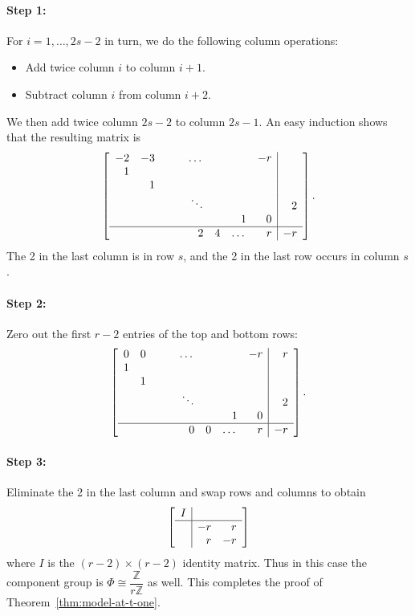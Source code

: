 \documentclass[reqno]{amsart}
\theoremstyle{definition}
\theoremstyle{remark}
\def\Z{\mathbb{Z}}
\def\isom{\cong}
\begin{document}
\paragraph{Step 1:}
\label{sec:step-1-even}

For $i = 1, \dots, 2s-2$ in turn, we do the following column operations:
\begin{itemize}
    \item Add twice column $i$ to column $i+1$.
    \item Subtract column $i$ from column $i+2$.
\end{itemize}
We then add twice column $2s-2$ to column $2s-1$. An easy induction shows that the resulting matrix is
\[
\left[\begin{array}{rrrrrrrr|r}
  -2 & -3 & & & \dots & & & -r & \\
  1 & & & & & & & & \\
  & 1 & & & & & & & \\
  & & & & \ddots & & & & 2 \\
  & & & & & & 1 & 0 & \\ \hline
  & & & & 2 & 4 & \dots & r & -r
\end{array}\right].
\]
The 2 in the last column is in row $s$, and the 2 in the last row occurs in column $s$.

\paragraph{Step 2:}
\label{sec:step-2-even}

Zero out the first $r-2$ entries of the top and bottom rows:
\[
\left[\begin{array}{rrrrrrrr|r}
  0 & 0 & & & \dots & & & -r & r \\
  1 & & & & & & & & \\
  & 1 & & & & & & & \\
  & & & & \ddots & & & & 2 \\
  & & & & & & 1 & 0 & \\ \hline
  & & & & 0 & 0 & \dots & r & -r
\end{array}\right].
\]

\paragraph{Step 3:}
\label{sec:step-3-even}

Eliminate the 2 in the last column and swap rows and columns to obtain
\[
\left[\begin{array}{c|rr}
  I & & \\ \hline
 & -r & r \\
& r & -r
\end{array}\right]
\]
where $I$ is the $(r-2) \times (r-2)$ identity matrix. Thus in this case the component group is $\Phi \isom \dfrac{\Z}{r\Z}$ as well. This completes the proof of Theorem~\ref{thm:model-at-t-one}.
\end{document}
